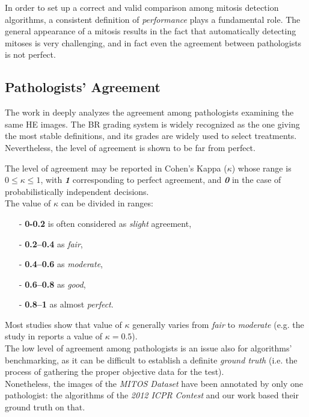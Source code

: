 In order to set up a correct and valid comparison among mitosis detection algorithms, a consistent definition of \textit{performance} plays a fundamental role.
The general appearance of a mitosis results in the fact that automatically detecting mitoses is very challenging, and in fact even the agreement between pathologists is not perfect.

\vspace{0.5cm}

\subsection{Pathologists' Agreement}
\label{ch3:humans}

The work in \cite{mitoticRecognition03Agreement} deeply analyzes the agreement among pathologists examining the same \Gls{HE} images. The \Gls{BR} grading system is widely
recognized as the one giving the most stable definitions, and its grades are widely used to select treatments. Nevertheless, the level of agreement is shown to be far from perfect.

The level of agreement may be reported in Cohen's Kappa ($\kappa$) \cite{cohen1960coefficient} whose range is $0 \leq \kappa \leq 1$, with
\textit{\textbf{1}} corresponding to perfect agreement, and \textit{\textbf{0}} in the case of probabilistically independent decisions.\\

The value of $\kappa$ can be divided in ranges:

\begin{itemize}
 \item [-] \textbf{0-0.2} is often considered as \textit{slight} agreement,
 \item [-] \textbf{0.2–0.4} as \textit{fair},
 \item [-] \textbf{0.4–0.6} as \textit{moderate},
 \item [-] \textbf{0.6–0.8} as \textit{good},
 \item [-] \textbf{0.8–1} as almost \textit{perfect}.
\end{itemize}

Most studies show that value of $\kappa$ generally varies from \textit{fair} to \textit{moderate} (e.g. the study in \cite{meyer2005breast} reports a value of $\kappa = 0.5$).\\
The low level of agreement among pathologists is an issue also for algorithms' benchmarking, as it can be difficult to establish a definite \textit{ground truth} (i.e. the process of gathering the proper objective data for the test).\\
Nonetheless, the images of the \textit{MITOS Dataset} have been annotated by only one pathologist: the algorithms of the \textit{2012 ICPR Contest} and our work based their ground truth on that.

